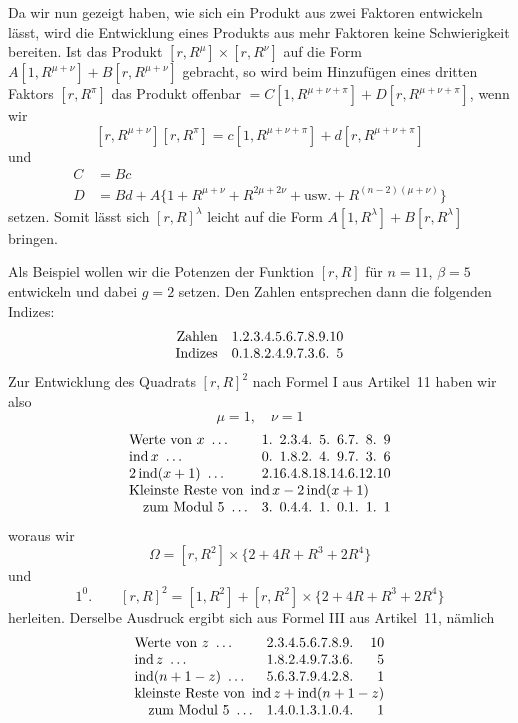 \clearpage
\hypertarget{native-264-pure13}{}\label{native-264-pure13}
Da wir nun gezeigt haben, wie sich ein Produkt aus zwei Faktoren entwickeln lässt, wird die Entwicklung eines Produkts aus mehr Faktoren keine Schwierigkeit bereiten. Ist das Produkt $[r,R^\mu]\times[r,R^\nu]$ auf die Form $A[1,R^{\mu+\nu}]+B[r,R^{\mu+\nu}]$ gebracht, so wird beim Hinzufügen eines dritten Faktors $[r,R^\pi]$ das Produkt offenbar $=C[1,R^{\mu+\nu+\pi}]+D[r,R^{\mu+\nu+\pi}]$, wenn wir
\[
[r,R^{\mu+\nu}][r,R^\pi]=c[1,R^{\mu+\nu+\pi}]+d[r,R^{\mu+\nu+\pi}]
\]
und
\[
\begin{aligned}
C&=Bc\\
D&=Bd+A\{1+R^{\mu+\nu}+R^{2\mu+2\nu}+\text{usw.}+R^{(n-2)(\mu+\nu)}\}
\end{aligned}
\]
setzen. Somit lässt sich $[r,R]^\lambda$ leicht auf die Form $A[1,R^\lambda]+B[r,R^\lambda]$ bringen.

Als Beispiel wollen wir die Potenzen der Funktion $[r,R]$ für $n=11$, $\beta=5$ entwickeln und dabei $g=2$ setzen. Den Zahlen entsprechen dann die folgenden Indizes:
\[
\begin{array}{r@{\quad}r@{\pdot}r@{\pdot}r@{\pdot}r@{\pdot}r@{\pdot}r@{\pdot}r@{\pdot}r@{\pdot}r@{\pdot}r}
\text{Zahlen}&1&2&3&4&5&6&7&8&9&10\\
\text{Indizes}&0&1&8&2&4&9&7&3&6&5
\end{array}
\]
Zur Entwicklung des Quadrats $[r,R]^2$ nach Formel I aus Artikel~11 haben wir also
\[
\mu=1,\quad\nu=1
\]
\[
\begin{array}{l@{\quad}r@{\pdot}r@{\pdot}r@{\pdot}r@{\pdot}r@{\pdot}r@{\pdot}r@{\pdot}r@{\pdot}r}
\text{Werte von }x\ \ldots&1&2&3&4&5&6&7&8&9\\
\operatorname{ind}x\ \ldots&0&1&8&2&4&9&7&3&6\\
2\operatorname{ind}(x+1)\ \ldots&2&16&4&8&18&14&6&12&10\\
\multicolumn{10}{l}{\text{Kleinste Reste von }\operatorname{ind}x-2\operatorname{ind}(x+1)}\\
\quad\text{zum Modul }5\ \ldots&3&0&4&4&1&0&1&1&1
\end{array}
\]
woraus wir
\[
\Omega=[r,R^2]\times\{2+4R+R^3+2R^4\}
\]
und
\[
1^0.\qquad[r,R]^2=[1,R^2]+[r,R^2]\times\{2+4R+R^3+2R^4\}
\]
herleiten. Derselbe Ausdruck ergibt sich aus Formel III aus Artikel~11, nämlich
\[
\begin{array}{l@{\quad}r@{\pdot}r@{\pdot}r@{\pdot}r@{\pdot}r@{\pdot}r@{\pdot}r@{\pdot}r@{\pdot}r}
\text{Werte von }z\ \ldots&2&3&4&5&6&7&8&9&10\\
\operatorname{ind}z\ \ldots&1&8&2&4&9&7&3&6&5\\
\operatorname{ind}(n+1-z)\ \ldots&5&6&3&7&9&4&2&8&1\\
\multicolumn{10}{l}{\text{kleinste Reste von }\operatorname{ind}z+\operatorname{ind}(n+1-z)}\\
\quad\text{zum Modul }5\ \ldots&1&4&0&1&3&1&0&4&1
\end{array}
\]

